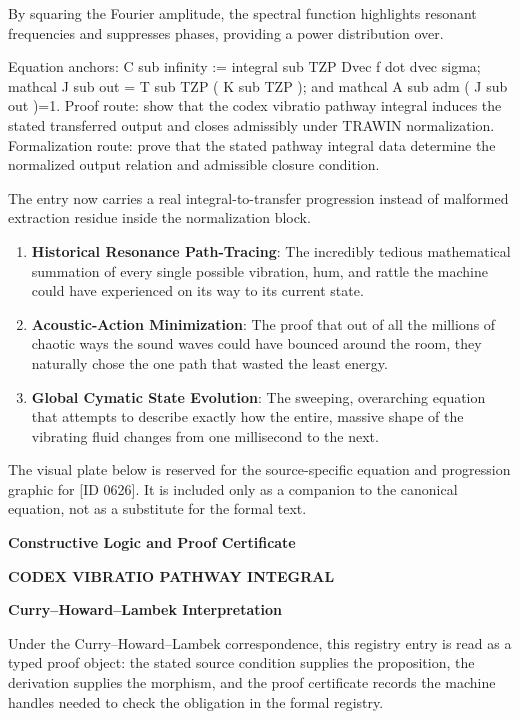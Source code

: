 By squaring the Fourier amplitude, the spectral function highlights resonant frequencies and suppresses phases, providing a power distribution over.

Equation anchors: C sub infinity := integral sub TZP Dvec f dot dvec sigma; mathcal J sub out = T sub TZP ( K sub TZP ); and mathcal A sub adm ( J sub out )=1. Proof route: show that the codex vibratio pathway integral induces the stated transferred output and closes admissibly under TRAWIN normalization. Formalization route: prove that the stated pathway integral data determine the normalized output relation and admissible closure condition.

The entry now carries a real integral-to-transfer progression instead of malformed extraction residue inside the normalization block.
\endgroup

\begin{enumerate}[leftmargin=1.6em,itemsep=6pt,topsep=4pt]
\item \textbf{Historical Resonance Path-Tracing}: The incredibly tedious mathematical summation of every single possible vibration, hum, and rattle the machine could have experienced on its way to its current state.
\item \textbf{Acoustic-Action Minimization}: The proof that out of all the millions of chaotic ways the sound waves could have bounced around the room, they naturally chose the one path that wasted the least energy.
\item \textbf{Global Cymatic State Evolution}: The sweeping, overarching equation that attempts to describe exactly how the entire, massive shape of the vibrating fluid changes from one millisecond to the next.
\end{enumerate}

\begingroup\footnotesize\sloppy
The visual plate below is reserved for the source-specific equation and progression graphic for [ID 0626]. It is included only as a companion to the canonical equation, not as a substitute for the formal text.
\par\endgroup
\ifTZPDarkEdition
{}
\fi

\clearpage
\begingroup\tzpsupportsetup
\noindent\textbf{\fontsize{10.8pt}{12.8pt}\selectfont [ID 0626] Constructive Logic and Proof Certificate}\par
\noindent\textbf{\fontsize{10pt}{12pt}\selectfont CODEX VIBRATIO PATHWAY INTEGRAL}\par
\vspace{0.45em}
\begingroup
\footnotesize
\setlength{\parskip}{0.22em}
\setlength{\parindent}{0pt}
\noindent\textbf{Curry--Howard--Lambek Interpretation}\par
Under the Curry--Howard--Lambek correspondence, this registry entry is read as a typed proof
object: the stated source condition supplies the proposition, the derivation supplies the
morphism, and the proof certificate records the machine handles needed to check the obligation
in the formal registry.


